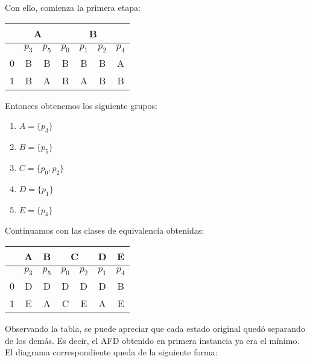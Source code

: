 {    Con ello, comienza la primera etapa:
    \begin{center}
      \centering
      \begin{tabular}{c | c | c | c | c | c | c}
        & \multicolumn{2}{c|}{A} & \multicolumn{4}{c}{B} \\    
        \hline
        & $p_3$ & $p_5$ & $p_0$ & $p_1$ & $p_2$ & $p_4$   \\
        \hline
        0 & B & B & B & B & B & A  \\
        1 & B & A & B & A & B & B
      \end{tabular}
    \end{center}

    Entonces obtenemos los siguiente grupos:
    \begin{enumerate}
      \item $A = \{p_3\}$
      \item $B = \{p_5\}$
      \item $C = \{p_0, p_2\}$
      \item $D = \{p_1\}$
      \item $E = \{p_4\}$
    \end{enumerate}

    Continuamos con las clases de equivalencia obtenidas:
    \begin{center}
      \centering
      \begin{tabular}{c | c | c | c | c | c | c}
        & \multicolumn{1}{c|}{A} & \multicolumn{1}{c|}{B} & \multicolumn{2}{c|}{C} & D & E \\    
        \hline
        & $p_3$ & $p_5$ & $p_0$ & $p_2$ & $p_1$ & $p_4$   \\
        \hline
        0 & D & D & D & D & D & B \\
        1 & E & A & C & E & A & E
      \end{tabular}
    \end{center}
        
    Observando la tabla, se puede apreciar que cada estado original quedó separando de los demás. Es decir, el AFD obtenido en primera instancia ya era el mínimo. El diagrama correspondiente queda de la siguiente forma:

    \begin{center}
\end{center}}
